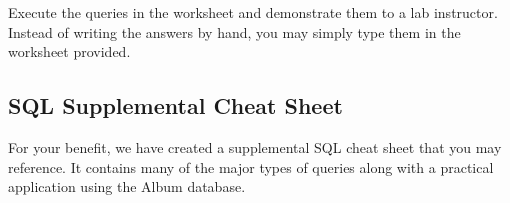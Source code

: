 \documentclass[12pt]{scrartcl}
\begin{document}
Execute the queries in the worksheet and demonstrate them to a
lab instructor.  Instead of writing the answers by hand, you may
simply type them in the worksheet provided.
  
\subsection*{SQL Supplemental Cheat Sheet}

For your benefit, we have created a supplemental SQL cheat sheet that 
you may reference.  It contains many of the major types of queries 
along with a practical application using the Album database.
\end{document}
